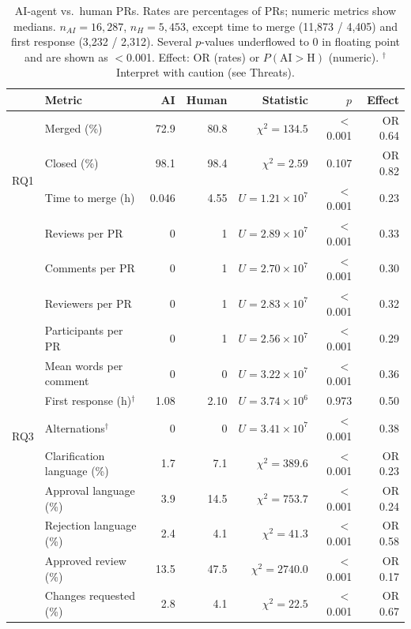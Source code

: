 \documentclass[conference]{IEEEtran}
\begin{document}
\begin{table}[t]
\caption{AI-agent vs.\ human PRs. Rates are percentages of PRs; numeric metrics show medians. $n_{AI}{=}16{,}287$, $n_H{=}5{,}453$, except time to merge (11{,}873 / 4{,}405) and first response (3{,}232 / 2{,}312). Several $p$-values underflowed to 0 in floating point and are shown as $<$0.001. Effect: OR (rates) or $P(\mathrm{AI}{>}\mathrm{H})$ (numeric). $^\dagger$ Interpret with caution (see Threats).}
\label{tab:results}
\centering\small
\begin{tabular}{@{}llrrrrr@{}}
\toprule
 & Metric & AI & Human & Statistic & $p$ & Effect \\
\midrule
\multirow{4}{*}{RQ1} & Merged (\%) & 72.9 & 80.8 & $\chi^2=134.5$ & $<$0.001 & OR 0.64 \\
 & Closed (\%) & 98.1 & 98.4 & $\chi^2=2.59$ & 0.107 & OR 0.82 \\
 & Time to merge (h) & 0.046 & 4.55 & $U=1.21{\times}10^{7}$ & $<$0.001 & 0.23 \\
 & Reviews per PR & 0 & 1 & $U=2.89{\times}10^{7}$ & $<$0.001 & 0.33 \\
\midrule
\multirow{11}{*}{RQ3} & Comments per PR & 0 & 1 & $U=2.70{\times}10^{7}$ & $<$0.001 & 0.30 \\
 & Reviewers per PR & 0 & 1 & $U=2.83{\times}10^{7}$ & $<$0.001 & 0.32 \\
 & Participants per PR & 0 & 1 & $U=2.56{\times}10^{7}$ & $<$0.001 & 0.29 \\
 & Mean words per comment & 0 & 0 & $U=3.22{\times}10^{7}$ & $<$0.001 & 0.36 \\
 & First response (h)$^\dagger$ & 1.08 & 2.10 & $U=3.74{\times}10^{6}$ & 0.973 & 0.50 \\
 & Alternations$^\dagger$ & 0 & 0 & $U=3.41{\times}10^{7}$ & $<$0.001 & 0.38 \\
 & Clarification language (\%) & 1.7 & 7.1 & $\chi^2=389.6$ & $<$0.001 & OR 0.23 \\
 & Approval language (\%) & 3.9 & 14.5 & $\chi^2=753.7$ & $<$0.001 & OR 0.24 \\
 & Rejection language (\%) & 2.4 & 4.1 & $\chi^2=41.3$ & $<$0.001 & OR 0.58 \\
 & Approved review (\%) & 13.5 & 47.5 & $\chi^2=2740.0$ & $<$0.001 & OR 0.17 \\
 & Changes requested (\%) & 2.8 & 4.1 & $\chi^2=22.5$ & $<$0.001 & OR 0.67 \\
\bottomrule
\end{tabular}
\end{table}
\end{document}
